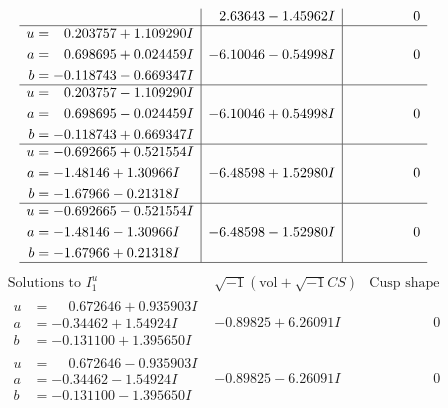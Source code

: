 \documentclass[1p]{elsarticle_modified}
\theoremstyle{definition}
\newcommand{\I}{\sqrt{-1}}
\begin{document}
$$\begin{array}{c|c|c}
 & \phantom{-}2.63643 - 1.45962 I & \phantom{-0.000000 } 0 \\ \hline\begin{aligned}
u &= \phantom{-}0.203757 + 1.109290 I \\
a &= \phantom{-}0.698695 + 0.024459 I \\
b &= -0.118743 - 0.669347 I\end{aligned}
 & -6.10046 - 0.54998 I & \phantom{-0.000000 } 0 \\ \hline\begin{aligned}
u &= \phantom{-}0.203757 - 1.109290 I \\
a &= \phantom{-}0.698695 - 0.024459 I \\
b &= -0.118743 + 0.669347 I\end{aligned}
 & -6.10046 + 0.54998 I & \phantom{-0.000000 } 0 \\ \hline\begin{aligned}
u &= -0.692665 + 0.521554 I \\
a &= -1.48146 + 1.30966 I \\
b &= -1.67966 - 0.21318 I\end{aligned}
 & -6.48598 + 1.52980 I & \phantom{-0.000000 } 0 \\ \hline\begin{aligned}
u &= -0.692665 - 0.521554 I \\
a &= -1.48146 - 1.30966 I \\
b &= -1.67966 + 0.21318 I\end{aligned}
 & -6.48598 - 1.52980 I & \phantom{-0.000000 } 0\\
 \hline 
 \end{array}$$\newpage$$\begin{array}{c|c|c}  
\text{Solutions to }I^u_{1}& \I (\text{vol} + \sqrt{-1}CS) & \text{Cusp shape}\\
 \hline 
\begin{aligned}
u &= \phantom{-}0.672646 + 0.935903 I \\
a &= -0.34462 + 1.54924 I \\
b &= -0.131100 + 1.395650 I\end{aligned}
 & -0.89825 + 6.26091 I & \phantom{-0.000000 } 0 \\ \hline\begin{aligned}
u &= \phantom{-}0.672646 - 0.935903 I \\
a &= -0.34462 - 1.54924 I \\
b &= -0.131100 - 1.395650 I\end{aligned}
 & -0.89825 - 6.26091 I & \phantom{-0.000000 } 0 \\ \hline\begin{aligned}

\end{aligned}
\end{array}$$
\end{document}
